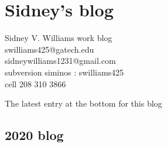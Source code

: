 


\chapter{Sidney's blog}
\label{chap:blogSVW}


\renewcommand{\Ssym}[1]{{\ensuremath{m_{#1}}}}    %
\renewcommand{\Refl}{\ensuremath{{\sigma}}} %
\renewcommand{\shift}{\ensuremath{r}}
\renewcommand{\ssp}{\ensuremath{\phi}}             %

	
{\large Sidney V.  Williams work blog}\\
swilliams425@gatech.edu\\
sidneywilliams1231@gmail.com\\
subversion siminos : swilliams425 \\ %
cell 208 310 3866

\hfill   {\color{red} The latest entry at the bottom for this blog}
\bigskip


\section{2020 blog}
\label{sect:sidney2020}

\bigskip

